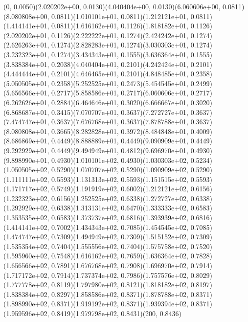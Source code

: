 (0, 0.0050)(2.020202e+00, 0.0130)(4.040404e+00, 0.0130)(6.060606e+00, 0.0811)(8.080808e+00, 0.0811)(1.010101e+01, 0.0811)(1.212121e+01, 0.0811)(1.414141e+01, 0.0811)(1.616162e+01, 0.1126)(1.818182e+01, 0.1126)(2.020202e+01, 0.1126)(2.222222e+01, 0.1274)(2.424242e+01, 0.1274)(2.626263e+01, 0.1274)(2.828283e+01, 0.1274)(3.030303e+01, 0.1274)(3.232323e+01, 0.1274)(3.434343e+01, 0.1555)(3.636364e+01, 0.1555)(3.838384e+01, 0.2038)(4.040404e+01, 0.2101)(4.242424e+01, 0.2101)(4.444444e+01, 0.2101)(4.646465e+01, 0.2101)(4.848485e+01, 0.2358)(5.050505e+01, 0.2358)(5.252525e+01, 0.2473)(5.454545e+01, 0.2499)(5.656566e+01, 0.2717)(5.858586e+01, 0.2717)(6.060606e+01, 0.2717)(6.262626e+01, 0.2884)(6.464646e+01, 0.3020)(6.666667e+01, 0.3020)(6.868687e+01, 0.3415)(7.070707e+01, 0.3637)(7.272727e+01, 0.3637)(7.474747e+01, 0.3637)(7.676768e+01, 0.3637)(7.878788e+01, 0.3637)(8.080808e+01, 0.3665)(8.282828e+01, 0.3972)(8.484848e+01, 0.4009)(8.686869e+01, 0.4449)(8.888889e+01, 0.4449)(9.090909e+01, 0.4449)(9.292929e+01, 0.4449)(9.494949e+01, 0.4812)(9.696970e+01, 0.4930)(9.898990e+01, 0.4930)(1.010101e+02, 0.4930)(1.030303e+02, 0.5234)(1.050505e+02, 0.5290)(1.070707e+02, 0.5290)(1.090909e+02, 0.5290)(1.111111e+02, 0.5593)(1.131313e+02, 0.5593)(1.151515e+02, 0.5593)(1.171717e+02, 0.5749)(1.191919e+02, 0.6002)(1.212121e+02, 0.6156)(1.232323e+02, 0.6156)(1.252525e+02, 0.6338)(1.272727e+02, 0.6338)(1.292929e+02, 0.6338)(1.313131e+02, 0.6470)(1.333333e+02, 0.6583)(1.353535e+02, 0.6583)(1.373737e+02, 0.6816)(1.393939e+02, 0.6816)(1.414141e+02, 0.7002)(1.434343e+02, 0.7085)(1.454545e+02, 0.7085)(1.474747e+02, 0.7309)(1.494949e+02, 0.7309)(1.515152e+02, 0.7309)(1.535354e+02, 0.7404)(1.555556e+02, 0.7404)(1.575758e+02, 0.7520)(1.595960e+02, 0.7548)(1.616162e+02, 0.7659)(1.636364e+02, 0.7828)(1.656566e+02, 0.7891)(1.676768e+02, 0.7908)(1.696970e+02, 0.7914)(1.717172e+02, 0.7914)(1.737374e+02, 0.7986)(1.757576e+02, 0.8029)(1.777778e+02, 0.8119)(1.797980e+02, 0.8121)(1.818182e+02, 0.8197)(1.838384e+02, 0.8297)(1.858586e+02, 0.8371)(1.878788e+02, 0.8371)(1.898990e+02, 0.8371)(1.919192e+02, 0.8371)(1.939394e+02, 0.8371)(1.959596e+02, 0.8419)(1.979798e+02, 0.8431)(200, 0.8436)